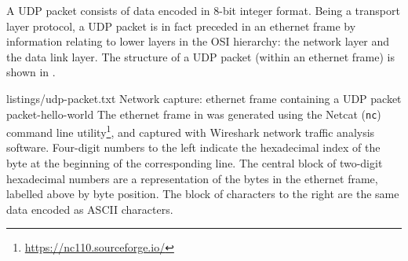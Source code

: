 A UDP packet consists of data encoded in 8-bit integer format.
Being a transport layer protocol, a UDP packet is in fact preceded in an
ethernet frame by information relating to lower layers in the OSI hierarchy: the
network layer and the data link layer.
The structure of a UDP packet (within an ethernet frame) is shown in
.

{listings/udp-packet.txt}
{Network capture: ethernet frame containing a UDP packet}
{packet-hello-world}
\noindent
The ethernet frame in  was generated
using the Netcat (\texttt{nc}) command line utility\footnote{
    \url{https://nc110.sourceforge.io/}
}, and captured with Wireshark network traffic analysis software.
Four-digit numbers to the left indicate the hexadecimal index of the byte
at the beginning of the corresponding line.
The central block of two-digit hexadecimal numbers are a representation of the
bytes in the ethernet frame, labelled above by byte position.
The block of characters to the right are the same data encoded as ASCII
characters.

